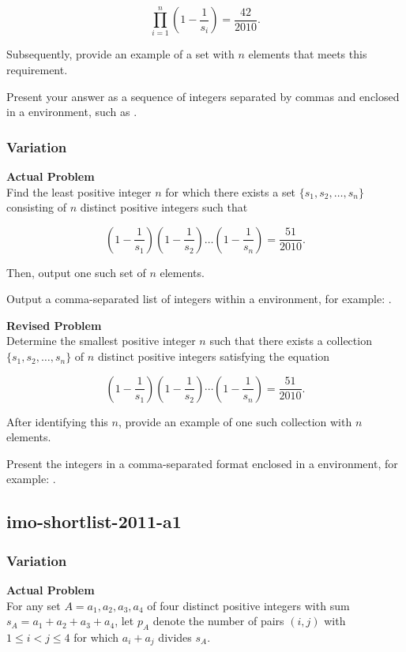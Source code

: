 $$
\prod_{i=1}^{n} \left(1 - \frac{1}{s_i}\right) = \frac{42}{2010}.
$$

Subsequently, provide an example of a set with \( n \) elements that meets this requirement.

Present your answer as a sequence of integers separated by commas and enclosed in a \boxed environment, such as .

\subsubsection{Variation}
\textbf{Actual Problem}\\
Find the least positive integer $n$ for which there exists a set $\{s_1, s_2, \ldots, s_n\}$ consisting of $n$ distinct positive integers such that

$$
\left(1 - \frac{1}{s_1}\right) \left(1 - \frac{1}{s_2}\right) \ldots \left(1 - \frac{1}{s_n}\right) = \frac{51}{2010}.
$$

Then, output one such set of $n$ elements.


Output a comma-separated list of integers within a \boxed environment, for example: .

\textbf{Revised Problem}\\
Determine the smallest positive integer \( n \) such that there exists a collection \(\{s_1, s_2, \ldots, s_n\}\) of \( n \) distinct positive integers satisfying the equation

$$
\left(1 - \frac{1}{s_1}\right) \left(1 - \frac{1}{s_2}\right) \cdots \left(1 - \frac{1}{s_n}\right) = \frac{51}{2010}.
$$

After identifying this \( n \), provide an example of one such collection with \( n \) elements.

Present the integers in a comma-separated format enclosed in a \boxed environment, for example: .

\subsection{imo-shortlist-2011-a1}
\subsubsection{Variation}
\textbf{Actual Problem}\\
For any set $A = {a_1, a_2, a_3, a_4}$ of four distinct positive integers with sum $s_A = a_1 + a_2 + a_3 + a_4$,
let $p_A$ denote the number of pairs $(i, j)$ with $1 \leq i < j \leq 4$ for which $a_i + a_j$ divides $s_A$. 

